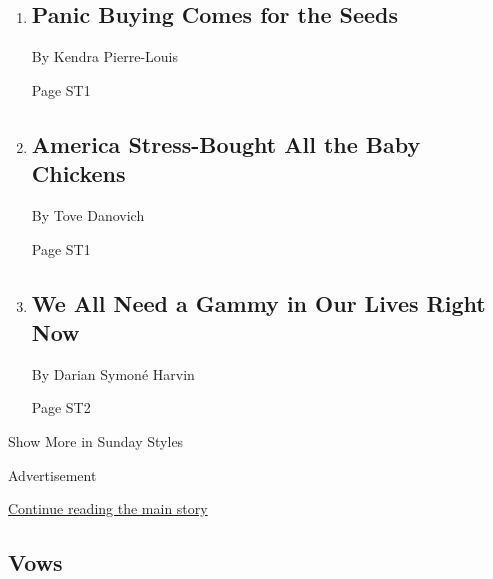 \begin{enumerate}
\def\labelenumi{\arabic{enumi}.}
\item
  \href{/2020/03/28/style/seed-panic-buying-coronavirus.html}{}

  \hypertarget{panic-buying-comes-for-the-seeds-1}{%
  \subsection{Panic Buying Comes for the
  Seeds}\label{panic-buying-comes-for-the-seeds-1}}

  By Kendra Pierre-Louis

  Page ST1
\item
  \href{/2020/03/28/style/chicken-eggs-coronavirus.html}{}

  \hypertarget{america-stress-bought-all-the-baby-chickens}{%
  \subsection{America Stress-Bought All the Baby
  Chickens}\label{america-stress-bought-all-the-baby-chickens}}

  By Tove Danovich

  Page ST1
\item
  \href{/2020/03/27/style/self-care/adrienne-banfield-norris-red-table-talk.html}{}

  \hypertarget{we-all-need-a-gammy-in-our-lives-right-now}{%
  \subsection{We All Need a Gammy in Our Lives Right
  Now}\label{we-all-need-a-gammy-in-our-lives-right-now}}

  By Darian Symoné Harvin

  Page ST2
\end{enumerate}

Show More in Sunday Styles

Advertisement

\protect\hyperlink{after-mid7}{Continue reading the main story}

\hypertarget{vows}{%
\subsection{Vows}\label{vows}}

